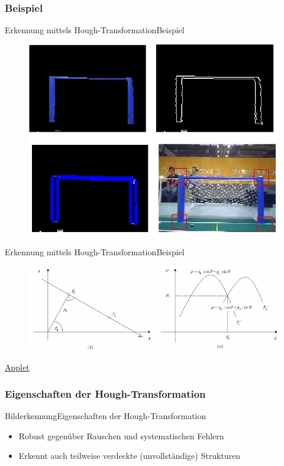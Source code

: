 \documentclass{beamer}
\begin{document}
\subsubsection{Beispiel}
\begin{frame}[label=hough]{Erkennung mittels Hough-Transformation}{Beispiel}
\begin{figure}[htp]
\centering
\includegraphics[scale=0.5]{hough-transformation-method.png}
\end{figure}
\end{frame}

\begin{frame}{Erkennung mittels Hough-Transformation}{Beispiel}
    \begin{figure}[htbp]
	\centering
	\includegraphics[scale=0.4]{hough-transformation.png}
	\end{figure}
	 \href{http://www.activovision.com/octavi/doku.php?id=hough_transform}{Applet}
\end{frame}


\subsubsection{Eigenschaften der Hough-Transformation}
\begin{frame}{Bilderkennung}{Eigenschaften der Hough-Transformation}
\begin{itemize}
    \item Robust gegenüber Rauschen und systematischen Fehlern
    \item Erkennt auch teilweise verdeckte (unvollständige) Strukturen
\end{itemize}
\end{frame}
\end{document}
